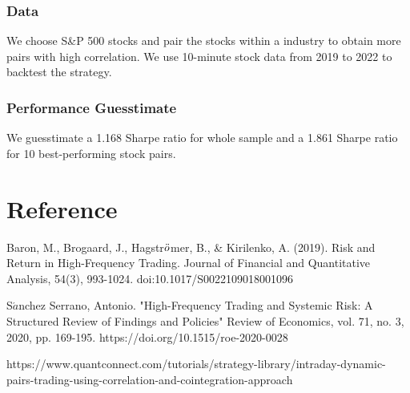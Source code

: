 \documentclass{article}
\begin{document}
\subsubsection{Data}

We choose S&P 500 stocks and pair the stocks within a industry to obtain more pairs with high correlation. We use 10-minute stock data from 2019 to 2022 to backtest the strategy. 

\subsubsection{Performance Guesstimate}

We guesstimate a 1.168 Sharpe ratio for whole sample and a 1.861 Sharpe ratio for 10 best-performing stock pairs.











\section*{Reference}


Baron, M., Brogaard, J., Hagstr$\Ddot{o}$mer, B., & Kirilenko, A. (2019). Risk and Return in High-Frequency Trading. Journal of Financial and Quantitative Analysis, 54(3), 993-1024. doi:10.1017/S0022109018001096

S$\acute{a}$nchez Serrano, Antonio. "High-Frequency Trading and Systemic Risk: A Structured Review of Findings and Policies" Review of Economics, vol. 71, no. 3, 2020, pp. 169-195. https://doi.org/10.1515/roe-2020-0028

https://www.quantconnect.com/tutorials/strategy-library/intraday-dynamic-pairs-trading-using-correlation-and-cointegration-approach
\end{document}
